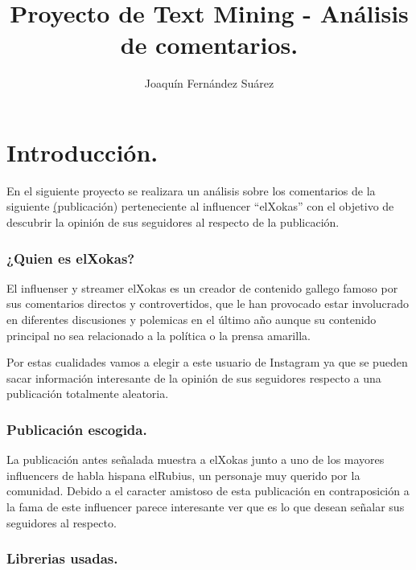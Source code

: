 \documentclass[
]{article}
\title{Proyecto de Text Mining - Análisis de comentarios.}
\author{Joaquín Fernández Suárez}
\date{}
\begin{document}
\maketitle

\hypertarget{introducciuxf3n.}{%
\section{Introducción.}\label{introducciuxf3n.}}

En el siguiente proyecto se realizara un análisis sobre los comentarios
de la siguiente
\href{https://www.instagram.com/p/CgemyPPKAGA/?utm_source=ig_web_copy_link&igshid=MzRlODBiNWFlZA==}(publicación)
perteneciente al influencer ``elXokas'' con el objetivo de descubrir la
opinión de sus seguidores al respecto de la publicación.

\hypertarget{quien-es-elxokas}{%
\subsubsection{¿Quien es elXokas?}\label{quien-es-elxokas}}

El influenser y streamer elXokas es un creador de contenido gallego
famoso por sus comentarios directos y controvertidos, que le han
provocado estar involucrado en diferentes discusiones y polemicas en el
último año aunque su contenido principal no sea relacionado a la
política o la prensa amarilla.

Por estas cualidades vamos a elegir a este usuario de Instagram ya que
se pueden sacar información interesante de la opinión de sus seguidores
respecto a una publicación totalmente aleatoria.

\hypertarget{publicaciuxf3n-escogida.}{%
\subsubsection{Publicación escogida.}\label{publicaciuxf3n-escogida.}}

La publicación antes señalada muestra a elXokas junto a uno de los
mayores influencers de habla hispana elRubius, un personaje muy querido
por la comunidad. Debido a el caracter amistoso de esta publicación en
contraposición a la fama de este influencer parece interesante ver que
es lo que desean señalar sus seguidores al respecto.

\hypertarget{librerias-usadas.}{%
\subsubsection{Librerias usadas.}\label{librerias-usadas.}}
\end{document}
